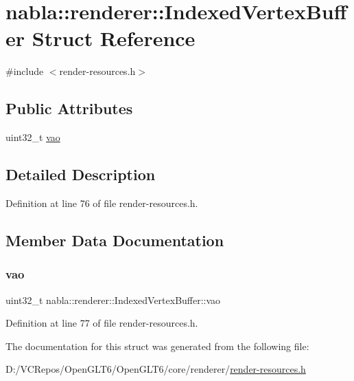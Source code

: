 \hypertarget{structnabla_1_1renderer_1_1_indexed_vertex_buffer}{}\section{nabla\+::renderer\+::Indexed\+Vertex\+Buffer Struct Reference}
\label{structnabla_1_1renderer_1_1_indexed_vertex_buffer}


{\ttfamily \#include $<$render-\/resources.\+h$>$}

\subsection*{Public Attributes}
\begin{DoxyCompactItemize}
\item 
uint32\+\_\+t \mbox{\hyperlink{structnabla_1_1renderer_1_1_indexed_vertex_buffer_a686fa9010e17f175d2a6c871d3402543}{vao}}
\end{DoxyCompactItemize}


\subsection{Detailed Description}


Definition at line 76 of file render-\/resources.\+h.



\subsection{Member Data Documentation}
\mbox{\label{structnabla_1_1renderer_1_1_indexed_vertex_buffer_a686fa9010e17f175d2a6c871d3402543}} 
\subsubsection{\texorpdfstring{vao}{vao}}
{\footnotesize\ttfamily uint32\+\_\+t nabla\+::renderer\+::\+Indexed\+Vertex\+Buffer\+::vao}



Definition at line 77 of file render-\/resources.\+h.



The documentation for this struct was generated from the following file\+:\begin{DoxyCompactItemize}
\item 
D\+:/\+V\+C\+Repos/\+Open\+G\+L\+T6/\+Open\+G\+L\+T6/core/renderer/\mbox{\hyperlink{render-resources_8h}{render-\/resources.\+h}}\end{DoxyCompactItemize}
